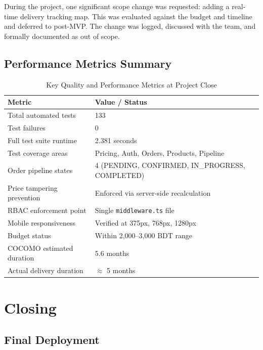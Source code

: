 \documentclass[12pt,a4paper]{report}
\begin{document}
During the project, one significant scope change was requested: adding a real-time delivery tracking map. This was evaluated against the budget and timeline and deferred to post-MVP. The change was logged, discussed with the team, and formally documented as out of scope.

\section{Performance Metrics Summary}

\begin{table}[H]
  \centering
  \caption{Key Quality and Performance Metrics at Project Close}
  \begin{tabularx}{\textwidth}{L{5cm} X}
    \toprule
    \textbf{Metric} & \textbf{Value / Status} \\
    \midrule
    Total automated tests        & 133 \\
    Test failures                & 0 \\
    Full test suite runtime      & 2.381 seconds \\
    Test coverage areas          & Pricing, Auth, Orders, Products, Pipeline \\
    Order pipeline states        & 4 (PENDING, CONFIRMED, IN\_PROGRESS, COMPLETED) \\
    Price tampering prevention   & Enforced via server-side recalculation \\
    RBAC enforcement point       & Single \texttt{middleware.ts} file \\
    Mobile responsiveness        & Verified at 375px, 768px, 1280px \\
    Budget status                & Within 2,000--3,000 BDT range \\
    COCOMO estimated duration    & 5.6 months \\
    Actual delivery duration     & $\approx$ 5 months \\
    \bottomrule
  \end{tabularx}
\end{table}

\chapter{Closing}

\section{Final Deployment}
\end{document}
